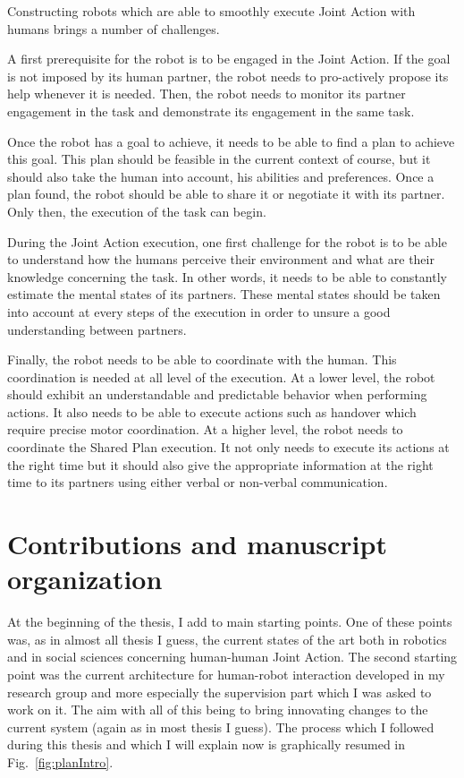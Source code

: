 \documentclass[english,a4paper,11pt,twoside]{StyleThese}
\begin{document}
Constructing robots which are able to smoothly execute Joint Action with humans brings a number of challenges. 

A first prerequisite for the robot is to be engaged in the Joint Action. If the goal is not imposed by its human partner, the robot needs to pro-actively propose its help whenever it is needed. Then, the robot needs to monitor its partner engagement in the task and demonstrate its engagement in the same task.

Once the robot has a goal to achieve, it needs to be able to find a plan to achieve this goal. This plan should be feasible in the current context of course, but it should also take the human into account, his abilities and preferences. Once a plan found, the robot should be able to share it or negotiate it with its partner. Only then, the execution of the task can begin.

During the Joint Action execution, one first challenge for the robot is to be able to understand how the humans perceive their environment and what are their knowledge concerning the task. In other words, it needs to be able to constantly estimate the mental states of its partners. These mental states should be taken into account at every steps of the execution in order to unsure a good understanding between partners.

Finally, the robot needs to be able to coordinate with the human. This coordination is needed at all level of the execution. At a lower level, the robot should exhibit an understandable and predictable behavior when performing actions. It also needs to be able to execute actions such as handover which require precise motor coordination. At a higher level, the robot needs to coordinate the Shared Plan execution. It not only needs to execute its actions at the right time but it should also give the appropriate information at the right time to its partners using either verbal or non-verbal communication.

\section*{Contributions and manuscript organization}

At the beginning of the thesis, I add to main starting points. One of these points was, as in almost all thesis I guess, the current states of the art both in robotics and in social sciences concerning human-human Joint Action. The second starting point was the current architecture for human-robot interaction developed in my research group and more especially the supervision part which I was asked to work on it. The aim with all of this being to bring innovating changes to the current system (again as in most thesis I guess). The process which I followed during this thesis and which I will explain now is graphically resumed in Fig.~\ref{fig:planIntro}.
\end{document}
